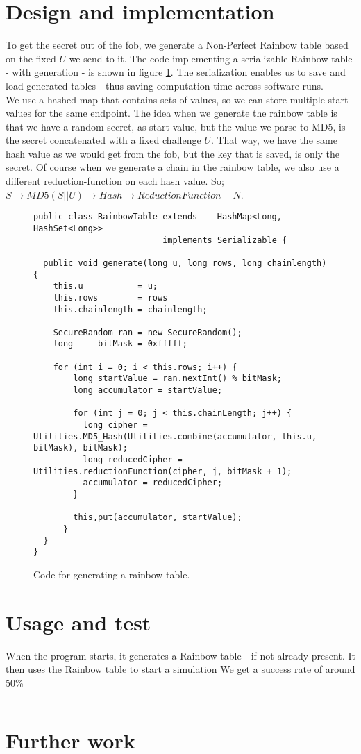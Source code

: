 \documentclass[10pt,a4paper]{article}
\begin{document}
\section*{Design and implementation}
To get the secret out of the fob, we generate a Non-Perfect Rainbow table based on the fixed $U$ we send to it.
The code implementing a serializable Rainbow table - with generation - is shown in figure \ref{fig:rainbow}. The serialization enables us to save and load generated tables - thus saving computation time across software runs.\\
We use a hashed map that contains sets of values, so we can store multiple start values for the same endpoint.
The idea when we generate the rainbow table is that we have a random secret, as start value, but the value we parse to MD5, is the secret concatenated with a fixed challenge $U$. That way, we have the same hash value as we would get from the fob, but the key that is saved, is only the secret. Of course when we generate a chain in the rainbow table, we also use a different reduction-function on each hash value. So; $S \rightarrow MD5(S ||U) \rightarrow  Hash \rightarrow  ReductionFunction  - N$.
\begin{figure}[h]
\begin{lstlisting}
public class RainbowTable extends    HashMap<Long, HashSet<Long>> 
                          implements Serializable {
                          
  public void generate(long u, long rows, long chainlength) {
    this.u           = u;
    this.rows        = rows
    this.chainlength = chainlength;
    
    SecureRandom ran = new SecureRandom();
    long     bitMask = 0xfffff;

    for (int i = 0; i < this.rows; i++) {
        long startValue = ran.nextInt() % bitMask;
        long accumulator = startValue;
        
        for (int j = 0; j < this.chainLength; j++) {
          long cipher = Utilities.MD5_Hash(Utilities.combine(accumulator, this.u, bitMask), bitMask);
          long reducedCipher = Utilities.reductionFunction(cipher, j, bitMask + 1);
          accumulator = reducedCipher;
        }

        this,put(accumulator, startValue);
      }
  }
}
\end{lstlisting}
\caption{Code for generating a rainbow table.}
\label{fig:rainbow}
\end{figure}
\section*{Usage and test}
When the program starts, it generates a Rainbow table - if not already present. It then uses the Rainbow table to start a simulation
We get a success rate of around 50\%
\begin{small}

\begin{verbatim}
\end{verbatim}
\end{small}

\section*{Further work}
\end{document}
